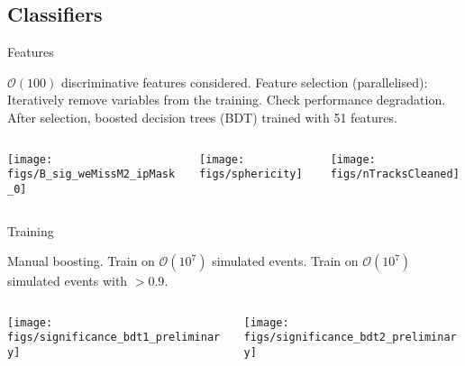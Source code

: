 \subsection{Classifiers}
\begin{frame}{Features}
\bi
\item $\mathcal{O}(100)$ discriminative features considered.
\itemii Feature selection (parallelised):
\bi
\itemiii Iteratively remove variables from the training.
\itemiii Check performance degradation.
\ei
\itemii After selection, boosted decision trees (BDT) trained with 51 features.
\ei

\vspace{0.5cm}

\begin{columns}
\begin{column}{0.333\linewidth}
\centering
\texttt{[image: figs/B\_sig\_weMissM2\_ipMask\_0]}
\end{column}
\begin{column}{0.333\linewidth}
\centering
\texttt{[image: figs/sphericity]}
\end{column}
\begin{column}{0.333\linewidth}
\centering
\texttt{[image: figs/nTracksCleaned]}
\end{column}
\end{columns}

\end{frame}
\begin{frame}{Training}
\bi
\item Manual boosting.
\bi
\itemii Train \bdto on $\mathcal{O}(10^7)$ simulated events.
\itemii Train \bdtt on $\mathcal{O}(10^7)$ simulated events with \bdto$>0.9$.
\ei
\ei
\vspace{0.5cm}
\begin{columns}
\begin{column}{0.5\linewidth}
\texttt{[image: figs/significance\_bdt1\_preliminary]}
\end{column}
\begin{column}{0.5\linewidth}
\texttt{[image: figs/significance\_bdt2\_preliminary]}
\end{column}
\end{columns}
\end{frame}
